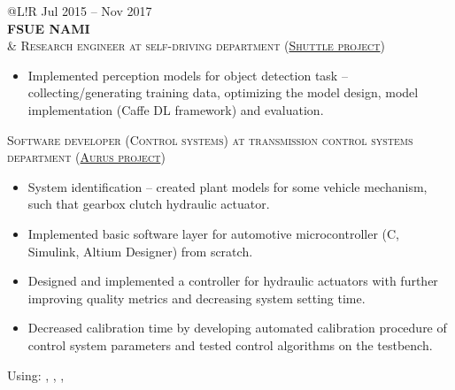  \begin{tabular}{@{}L!{\VRule}R}
    Jul 2015 -- Nov 2017                                                                                                       \\ {\bf FSUE NAMI} \\  &
    {\textsc{Research engineer at self-driving department (\href{https://www.engadget.com/2016/08/28/yandex-teams-on-self-driving-shuttle-bus/}{Shuttle project})}}
    \begin{itemize}
        \item Implemented perception models for object detection task -- collecting/generating training data, optimizing the model design, model implementation (Caffe DL framework) and evaluation.
    \end{itemize}
    \textsc{Software developer (Control systems) at transmission control systems department (\href{https://en.wikipedia.org/wiki/Aurus_Senat}{Aurus project})}
    \begin{itemize}
        \item System identification -- created plant models for some vehicle mechanism, such that gearbox clutch hydraulic actuator.
        \item Implemented basic software layer for automotive microcontroller (C, Simulink, Altium Designer) from scratch.
        \item Designed and implemented a controller for hydraulic actuators with further improving quality metrics and decreasing system setting time.
        \item Decreased calibration time by developing automated calibration procedure of control system parameters and tested control algorithms on the testbench.
    \end{itemize}
    Using: , , ,                                                                                          \\  
\end{tabular}                                                                                                \\
